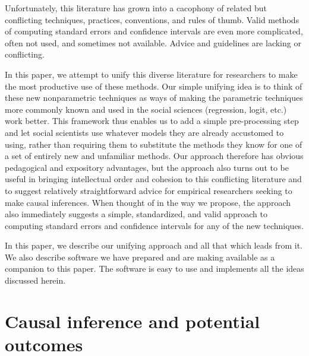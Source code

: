 \documentclass[11pt,titlepage]{article}
\begin{document}
Unfortunately, this literature has grown into a cacophony of related but
conflicting techniques, practices, conventions, and rules of thumb.
Valid methods of computing standard errors and confidence intervals are
even more complicated, often not used, and sometimes not available.
Advice and guidelines are lacking or conflicting.
                                                                                                                                                             
In this paper, we attempt to unify this diverse literature for
researchers to make the most productive use of these methods.  Our
simple unifying idea is to think of these new nonparametric techniques
as ways of making the parametric techniques more commonly known and
used in the social sciences (regression, logit, etc.) work better.
This framework thus enables us to add a simple pre-processing step and
let social scientists use whatever models they are already accustomed
to using, rather than requiring them to substitute the methods they
know for one of a set of entirely new and unfamiliar methods.  Our
approach therefore has obvious pedagogical and expository advantages,
but the approach also turns out to be useful in bringing intellectual
order and cohesion to this conflicting literature and to suggest
relatively straightforward advice for empirical researchers seeking to
make causal inferences.  When thought of in the way we propose, the
approach also immediately suggests a simple, standardized, and valid
approach to computing standard errors and confidence intervals for any
of the new techniques.
                                                                                                                                                             
In this paper, we describe our unifying approach and all that which leads
from it.  We also describe software we have prepared and are making
available as a companion to this paper.  The software is easy to use and
implements all the ideas discussed herein.
                                                                                                                                                             
\section{Causal inference and potential outcomes}
\end{document}
